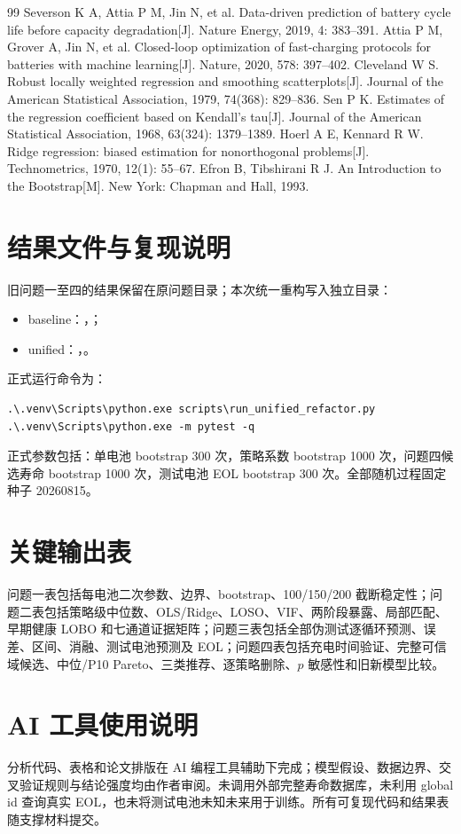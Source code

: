\documentclass[UTF8,a4paper,zihao=-4]{ctexart}
\begin{document}
\begin{thebibliography}{99}
 Severson K A, Attia P M, Jin N, et al. Data-driven prediction of battery cycle life before capacity degradation[J]. Nature Energy, 2019, 4: 383--391.
 Attia P M, Grover A, Jin N, et al. Closed-loop optimization of fast-charging protocols for batteries with machine learning[J]. Nature, 2020, 578: 397--402.
 Cleveland W S. Robust locally weighted regression and smoothing scatterplots[J]. Journal of the American Statistical Association, 1979, 74(368): 829--836.
 Sen P K. Estimates of the regression coefficient based on Kendall's tau[J]. Journal of the American Statistical Association, 1968, 63(324): 1379--1389.
 Hoerl A E, Kennard R W. Ridge regression: biased estimation for nonorthogonal problems[J]. Technometrics, 1970, 12(1): 55--67.
 Efron B, Tibshirani R J. An Introduction to the Bootstrap[M]. New York: Chapman and Hall, 1993.
\end{thebibliography}

\appendix
\section{结果文件与复现说明}

旧问题一至四的结果保留在原问题目录；本次统一重构写入独立目录：
\begin{itemize}
  \item baseline：，；
  \item unified：，。
\end{itemize}
正式运行命令为：
\begin{lstlisting}[language={}]
.\.venv\Scripts\python.exe scripts\run_unified_refactor.py
.\.venv\Scripts\python.exe -m pytest -q
\end{lstlisting}
正式参数包括：单电池 bootstrap 300 次，策略系数 bootstrap 1000 次，问题四候选寿命 bootstrap 1000 次，测试电池 EOL bootstrap 300 次。全部随机过程固定种子 20260815。

\section{关键输出表}

问题一表包括每电池二次参数、边界、bootstrap、100/150/200 截断稳定性；问题二表包括策略级中位数、OLS/Ridge、LOSO、VIF、两阶段暴露、局部匹配、早期健康 LOBO 和七通道证据矩阵；问题三表包括全部伪测试逐循环预测、误差、区间、消融、测试电池预测及 EOL；问题四表包括充电时间验证、完整可信域候选、中位/P10 Pareto、三类推荐、逐策略删除、$p$ 敏感性和旧新模型比较。

\section{AI 工具使用说明}

分析代码、表格和论文排版在 AI 编程工具辅助下完成；模型假设、数据边界、交叉验证规则与结论强度均由作者审阅。未调用外部完整寿命数据库，未利用 global id 查询真实 EOL，也未将测试电池未知未来用于训练。所有可复现代码和结果表随支撑材料提交。
\end{document}
